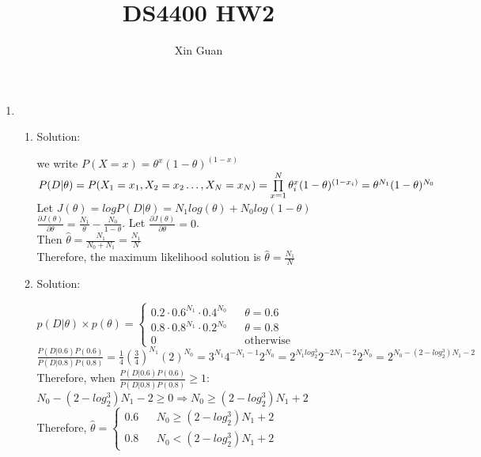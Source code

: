 \documentclass[12pt]{article}
\title{DS4400 HW2}
\author{Xin Guan}
\date{}
\newcommand{\solu}{{\color{blue} Solution:}}
\begin{document}
    \begin{enumerate}
        \item \begin{enumerate}
            \item \solu
            
            we write $P(X = x) = \theta^x(1-\theta)^{(1-x)}$\\
            $P(D | \theta) = P(X_1 = x_1, X_2 = x_2 \dots, X_N= x_N)\\
            = \prod\limits_{x = 1}^{N}\theta^x_i(1-\theta)^{(1-x_i)}\\
            = \theta^{N_1}(1-\theta)^{N_0}$\\
            Let $J(\theta) = logP(D | \theta) = N_1log(\theta) + N_0log(1 - \theta)$\\
            $\frac{\partial J(\theta)}{\partial \theta} = \frac{N_1}{\theta} - \frac{N_0}{1 - \theta}$.
            Let $\frac{\partial J(\theta)}{\partial \theta} = 0$.\\
            Then $\hat{\theta} = \frac{N_1}{N_0 + N_1} = \frac{N_1}{N}$\\
            Therefore, the maximum likelihood solution is $\hat{\theta} = \frac{N_1}{N}$

            \item \solu 
            
            $p(D | \theta) \times p(\theta) =  \left\{
                \begin{array}{rcl}
                0.2\cdot 0.6^{N_1} \cdot 0.4^{N_0}  & & \theta = 0.6 \\
                0.8\cdot 0.8^{N_1} \cdot 0.2^{N_0} & & \theta = 0.8 \\
                0 & & \text{otherwise}
            \end{array}
            \right.$\\
            $\frac{P(D|0.6)P(0.6)}{P(D|0.8)P(0.8)} = \frac{1}{4}(\frac{3}{4})^{N_1}(2)^{N_0} = 3^{N_1}4^{-N_1-1}2^{N_0} = 2^{N_1log_2^3}2^{-2N_1 - 2}2^{N_0} = 2^{N_0 - (2-log_2^3)N_1 - 2}$\\
            Therefore, when $\frac{P(D|0.6)P(0.6)}{P(D|0.8)P(0.8)} \ge 1:$\\
            $N_0 -(2-log_2^3)N_1 -2 \ge 0 \Rightarrow N_0 \ge (2-log_2^3)N_1 +2$\\
            Therefore, $\hat{\theta} = \left\{
                \begin{array}{rcl}
                0.6 & & N_0 \ge (2-log_2^3)N_1 +2 \\
                0.8 & & N_0 < (2-log_2^3)N_1 +2
            \end{array}
            \right.$
        \end{enumerate}


\end{enumerate}
\end{document}

